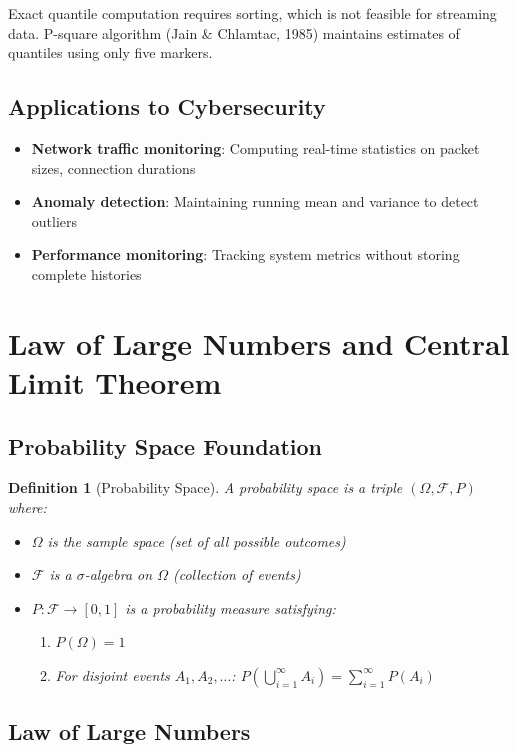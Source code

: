 \documentclass[12pt,a4paper]{article}
\newtheorem{definition}{Definition}
\begin{document}
Exact quantile computation requires sorting, which is not feasible for streaming data. P-square algorithm (Jain \& Chlamtac, 1985) maintains estimates of quantiles using only five markers.

\subsection{Applications to Cybersecurity}
\begin{itemize}
\item \textbf{Network traffic monitoring}: Computing real-time statistics on packet sizes, connection durations
\item \textbf{Anomaly detection}: Maintaining running mean and variance to detect outliers
\item \textbf{Performance monitoring}: Tracking system metrics without storing complete histories
\end{itemize}

\section{Law of Large Numbers and Central Limit Theorem}

\subsection{Probability Space Foundation}

\begin{definition}[Probability Space]
A probability space is a triple $(\Omega, \mathcal{F}, P)$ where:
\begin{itemize}
\item $\Omega$ is the sample space (set of all possible outcomes)
\item $\mathcal{F}$ is a $\sigma$-algebra on $\Omega$ (collection of events)
\item $P: \mathcal{F} \to [0,1]$ is a probability measure satisfying:
\begin{enumerate}
\item $P(\Omega) = 1$
\item For disjoint events $A_1, A_2, \ldots$: $P(\bigcup_{i=1}^\infty A_i) = \sum_{i=1}^\infty P(A_i)$
\end{enumerate}
\end{itemize}
\end{definition}

\subsection{Law of Large Numbers}
\end{document}

